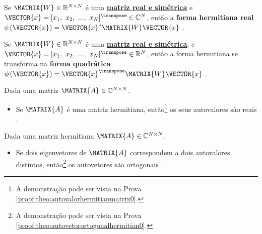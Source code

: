\begin{definition}\label{def:formhermitianareal0}
Se $\MATRIX{W} \in \mathbb{R}^{N \times N}$ é uma \hyperref[def:symmetricmatrix0]{\textbf{matriz real e simétrica}}
e $\VECTOR{x}=[x_1,~x_2,~...,~x_N]^{\transpose}\in \mathbb{C}^{N}$,
então a \textbf{forma hermitiana real} 
$\phi\left(\VECTOR{x}\right) = \VECTOR{x}^{\ast}\MATRIX{W}\VECTOR{x}$ \cite[pp. 386]{mirsky2012introduction}.
\end{definition}

\begin{definition}\label{def:formhermitianareal1}
Se $\MATRIX{W} \in \mathbb{R}^{N \times N}$ é uma \hyperref[def:symmetricmatrix0]{\textbf{matriz real e simétrica}},
e  $\VECTOR{x}=[x_1,~x_2,~...,~x_N]^{\transpose}\in \mathbb{R}^{N}$,
então a forma hermitiana se transforma na \textbf{forma quadrática} 
$\phi\left(\VECTOR{x}\right) = \VECTOR{x}^{\transpose}\MATRIX{W}\VECTOR{x}$ \cite[pp. 386]{mirsky2012introduction}.
\end{definition}

\begin{theorem}\label{theo:autovalorhermitianmatrix0}
Dada uma matriz $\MATRIX{A} \in \mathbb{C}^{N \times N}$.
\begin{itemize}
\item Se $\MATRIX{A}$ é uma matriz hermitiana, então\footnote{A
demonstração pode ser vista na Prova \ref{proof:theo:autovalorhermitianmatrix0}.} 
os seus autovalores são reais \cite[pp. 309]{robbin2018matrix}.
\end{itemize}
\end{theorem}

\begin{theorem}\label{theo:autovetorortogonalhermitian0}
Dada uma matriz hermitiana $\MATRIX{A} \in \mathbb{C}^{N \times N}$.
\begin{itemize}
\item Se dois eigenvetores de $\MATRIX{A}$ correspondem a dois autovalores distintos, então\footnote{A
demonstração pode ser vista na Prova \ref{proof:theo:autovetorortogonalhermitian0}.} 
os autovetores são ortogonais \cite[pp. 309]{robbin2018matrix}.
\end{itemize}
\end{theorem}

